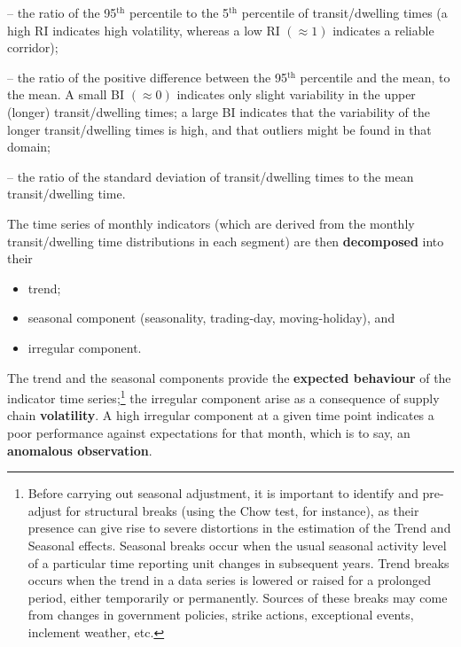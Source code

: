 \begin{Example}
\begin{description}[noitemsep]
\item[Reliability Indicator (RI)] -- the ratio of the 95$^{\text{th}}$ percentile to the 5$^{\text{th}}$ percentile of transit/dwelling times (a high RI indicates high volatility, whereas a low RI $(\approx 1)$ indicates a reliable corridor);
\item[Buffer Index (BI)] -- the ratio of the positive difference between the 95$^{\text{th}}$ percentile and the mean, to the mean. A small BI $(\approx 0)$ indicates only slight variability in the upper (longer) transit/dwelling times; a large BI indicates that the variability of the longer transit/dwelling times is high, and that outliers might be found in that domain;
\item[Coefficient of Variation (CV)] -- the ratio of the standard deviation of transit/dwelling times to the mean transit/dwelling time.  
\end{description}
The time series of monthly indicators (which are derived from the monthly transit/dwelling time distributions in each segment) are then \textbf{decomposed} into their 
\begin{itemize}[noitemsep]
\item trend;
\item seasonal component (seasonality, trading-day, moving-holiday), and 
\item irregular component.
\end{itemize}
\noindent The trend and the seasonal components provide the \textbf{expected behaviour} of the indicator time series;\footnote{Before carrying out seasonal adjustment, it is important to identify and pre-adjust for structural breaks (using the Chow test, for instance), as their presence can give rise to severe distortions in the estimation of the Trend and Seasonal effects. Seasonal breaks occur when the usual seasonal activity level of a particular time reporting unit changes in subsequent years. Trend breaks occurs when the trend in a data series is lowered or raised for a prolonged period, either temporarily or permanently. Sources of these breaks may come from changes in government policies, strike actions, exceptional events, inclement weather, etc.} the irregular component arise as a consequence of supply chain \textbf{volatility}. A high irregular component at a given time point indicates a poor performance against expectations for that month, which is to say, an \textbf{anomalous observation}.  
\begin{figure}[t]

\end{figure}
\end{Example}
